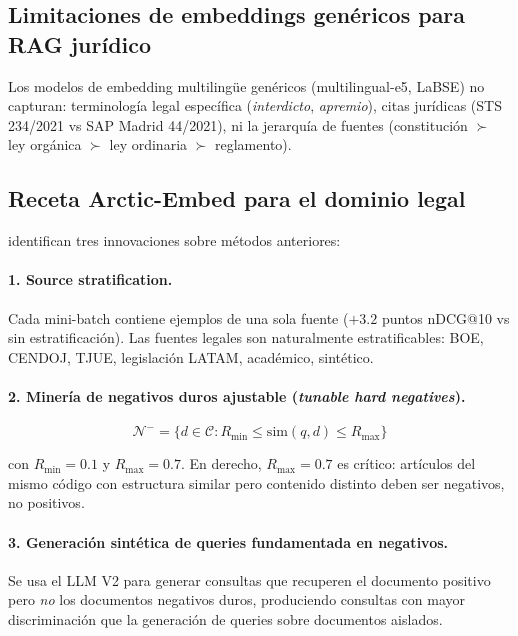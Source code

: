\documentclass[11pt,a4paper]{article}
\begin{document}
\subsection{Limitaciones de embeddings genéricos para RAG jurídico}

Los modelos de embedding multilingüe genéricos (multilingual-e5, LaBSE) no capturan:
terminología legal específica (\textit{interdicto}, \textit{apremio}), citas
jurídicas (STS 234/2021 vs SAP Madrid 44/2021), ni la jerarquía de fuentes
(constitución $\succ$ ley orgánica $\succ$ ley ordinaria $\succ$ reglamento).

\subsection{Receta Arctic-Embed para el dominio legal}

\citet{merrick2024arctic} identifican tres innovaciones sobre métodos anteriores:

\paragraph{1. Source stratification.} Cada mini-batch contiene ejemplos de una sola
fuente ($+3.2$ puntos nDCG@10 vs sin estratificación). Las fuentes legales son
naturalmente estratificables: BOE, CENDOJ, TJUE, legislación LATAM, académico,
sintético.

\paragraph{2. Minería de negativos duros ajustable (\textit{tunable hard negatives}).}

\begin{equation}
  \mathcal{N}^- = \{d \in \mathcal{C} : R_{\min} \leq \text{sim}(q, d) \leq R_{\max}\}
\end{equation}

con $R_{\min}=0.1$ y $R_{\max}=0.7$. En derecho, $R_{\max}=0.7$ es crítico:
artículos del mismo código con estructura similar pero contenido distinto
deben ser negativos, no positivos.

\paragraph{3. Generación sintética de queries fundamentada en negativos.}

Se usa el LLM V2 para generar consultas que recuperen el documento positivo pero
\textit{no} los documentos negativos duros, produciendo consultas con mayor
discriminación que la generación de queries sobre documentos aislados.
\end{document}
